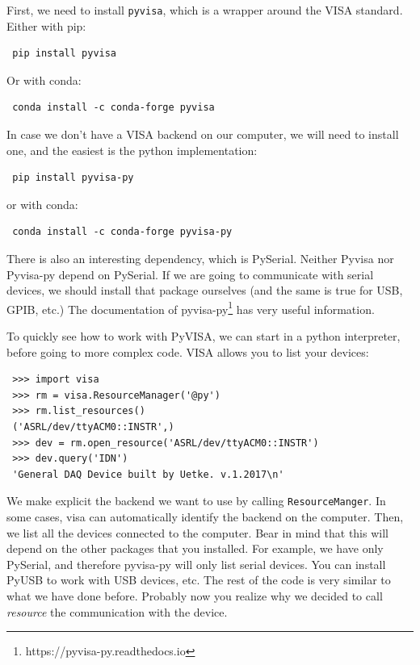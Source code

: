 First, we need to install \texttt{pyvisa}, which is a wrapper around the VISA standard. Either with pip:

\begin{verbatim}
 pip install pyvisa
\end{verbatim}

Or with conda:

\begin{verbatim}
 conda install -c conda-forge pyvisa
\end{verbatim}

In case we don't have a VISA backend on our computer, we will need to install one, and the easiest is the python implementation:

\begin{verbatim}
 pip install pyvisa-py
\end{verbatim}

or with conda:

\begin{verbatim}
 conda install -c conda-forge pyvisa-py
\end{verbatim}

There is also an interesting dependency, which is PySerial. Neither Pyvisa nor Pyvisa-py depend on PySerial. If we are going to communicate with serial devices, we should install that package ourselves (and the same is true for USB, GPIB, etc.) The documentation of pyvisa-py\footnote{https://pyvisa-py.readthedocs.io} has very useful information.

To quickly see how to work with PyVISA, we can start in a python interpreter, before going to more complex code. VISA allows you to list your devices:

\begin{verbatim}
 >>> import visa
 >>> rm = visa.ResourceManager('@py')
 >>> rm.list_resources()
 ('ASRL/dev/ttyACM0::INSTR',)
 >>> dev = rm.open_resource('ASRL/dev/ttyACM0::INSTR')
 >>> dev.query('IDN')
 'General DAQ Device built by Uetke. v.1.2017\n'
\end{verbatim}

We make explicit the backend we want to use by calling \texttt{ResourceManger}. In some cases, visa can automatically identify the backend on the computer. Then, we list all the devices connected to the computer. Bear in mind that this will depend on the other packages that you installed. For example, we have only PySerial, and therefore pyvisa-py will only list serial devices. You can install PyUSB to work with USB devices, etc. The rest of the code is very similar to what we have done before. Probably now you realize why we decided to call \emph{resource} the communication with the device.

